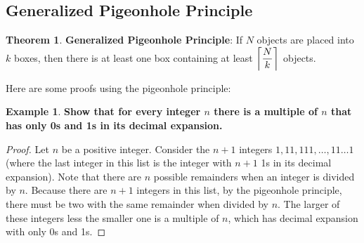 \documentclass[article, 12pt]{article}
\theoremstyle{definition}
\newtheorem{example}{Example}[subsection]
\newtheorem{theorem}{Theorem}[subsection]
\DeclarePairedDelimiter\ceil{\lceil}{\rceil} %
\newcommand{\df}{\displaystyle\frac} %
\begin{document}
    \subsection{Generalized Pigeonhole Principle}
    \begin{theorem}
        \textbf{Generalized Pigeonhole Principle}: If $N$ objects are placed into $k$ boxes, then there is at least one box containing at least $\ceil*{\df{N}{k}}$ objects.
    \end{theorem}
    Here are some proofs using the pigeonhole principle:
    \begin{example}
        \textbf{Show that for every integer $n$ there is a multiple of $n$ that has only 0s and 1s in its decimal expansion.}
        \begin{proof}
            Let $n$ be a positive integer. Consider the $n+1$ integers $1,11,111,\dots,11\dots 1$ (where the last integer in this list is the integer with $n+1$ 1s in its decimal expansion). Note that there are $n$ possible remainders when an integer is divided by $n$. Because there are $n+1$ integers in this list, by the pigeonhole principle, there must be two with the same remainder when divided by $n$. The larger of these integers less the smaller one is a multiple of $n$, which has decimal expansion with only 0s and 1s.
        \end{proof}
    \end{example}
\end{document}
